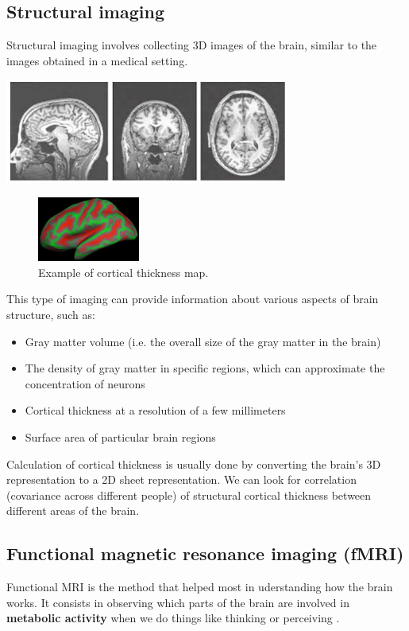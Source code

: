 \subsection{Structural imaging}
Structural imaging involves collecting 3D images of the brain, similar to the images obtained in a medical setting.

\begin{center}
\includegraphics[width=0.7\textwidth]{images/structural_imaging.png}
\end{center}

\begin{figure}
  \centering \includegraphics[width=0.3\textwidth]{images/thickness.png}
  \caption{Example of cortical thickness map.}
\end{figure}
This type of imaging can provide information about various aspects of brain 
structure, such as:

\begin{itemize}
    \item Gray matter volume (i.e. the overall size of the gray matter in the brain)
    \item The density of gray matter in specific regions, which can approximate the concentration of neurons
    \item Cortical thickness at a resolution of a few millimeters
    \item Surface area of particular brain regions
\end{itemize}

Calculation of cortical thickness is usually done by converting the brain's 3D representation to a 2D sheet representation.
We can look for correlation (covariance across different people) of structural cortical thickness between different areas of the brain.

\subsection{Functional  magnetic resonance imaging (fMRI)}
Functional MRI is the method that helped most in uderstanding how the brain works. It consists in observing which parts of the brain are involved in \textbf{metabolic activity} when we do things like thinking or perceiving \notet.

